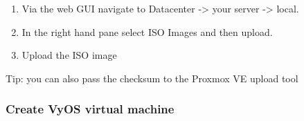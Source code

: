 \documentclass[
	11pt, %
	fleqn, %
	a4paper, %
]{LegrandOrangeBook}
\begin{document}
\begin{enumerate}
\def\labelenumi{\arabic{enumi}.}
\item
  Via the web GUI navigate to Datacenter -\textgreater{} your server
  -\textgreater{} local.
\item
  In the right hand pane select ISO Images and then upload.
\item
  Upload the ISO image
\end{enumerate}

Tip: you can also pass the checksum to the Proxmox VE upload tool

\hypertarget{create-vyos-virtual-machine}{%
\subsubsection{Create VyOS virtual
machine}\label{create-vyos-virtual-machine}}
\end{document}
